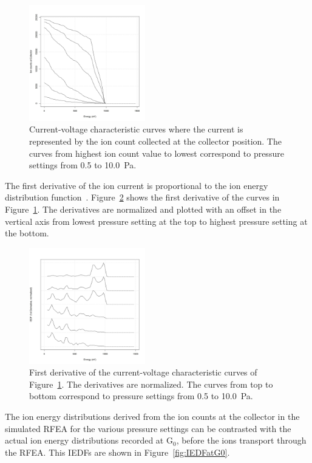 \begin{figure}[htbp]
\centering
\includegraphics[width=0.45\textwidth]{Figures/IVcurve.jpeg}
\caption{Current-voltage characteristic curves where the current is represented by the ion count collected at the collector position. The curves from highest ion count value to lowest correspond to pressure settings from 0.5 to 10.0~Pa.}
\label{fig:IVcurve}
\end{figure}

The first derivative of the ion current is proportional to the ion energy distribution function~\cite{Hutchinson1987}. Figure~\ref{fig:1stDerivative} shows the first derivative of the curves in Figure~\ref{fig:IVcurve}. The derivatives are normalized and plotted with an offset in the vertical axis from lowest pressure setting at the top to highest pressure setting at the bottom.

\begin{figure}[htbp]
\centering
\includegraphics[width=0.45\textwidth]{Figures/1stDerivative.jpeg}
\caption{First derivative of the current-voltage characteristic curves of Figure~\ref{fig:IVcurve}. The derivatives are normalized. The curves from top to bottom correspond to pressure settings from 0.5 to 10.0~Pa.}
\label{fig:1stDerivative}
\end{figure}

The ion energy distributions derived from the ion counts at the collector in the simulated RFEA for the various pressure settings can be contrasted with the actual ion energy distributions recorded at G$_0$, before the ions transport through the RFEA. This IEDFs are shown in Figure~\ref{fig:IEDFatG0}. 


